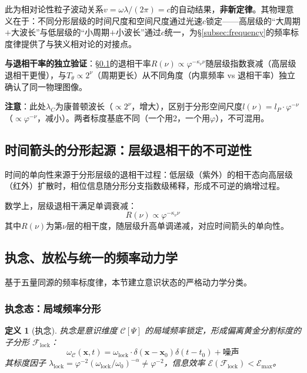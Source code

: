 \documentclass[12pt,a4paper,twocolumn]{article}
\renewcommand{\phi}{\varphi}
\newtheorem{definition}[theorem]{定义}
\begin{document}
此为相对论性粒子波动关系$v = \omega\lambda/(2\pi) = c$的自动结果，\textbf{非新定律}。其物理意义在于：不同分形层级的时间尺度和空间尺度通过光速$c$锁定——高层级的``大周期$+$大波长''与低层级的``小周期$+$小波长''通过$c$统一，为§\ref{subsec:frequency}的频率标度律提供了与狭义相对论的对接点。

\textbf{与退相干率的独立验证}：§\ref{subsec:time_arrow}的退相干率$R(\nu) \propto \phi^{-\kappa_\nu\nu}$随层级指数衰减（高层级退相干更慢），与$T_\theta \propto 2^{\nu}$（周期更长）从不同角度（内禀频率 vs 退相干率）独立确认了同一物理图像。

\textbf{注意}：此处$\lambda_C$为康普顿波长（$\propto 2^{\nu}$，增大），区别于分形空间尺度$l(\nu) = l_P \cdot \phi^{-\nu}$（$\propto \phi^{-\nu}$，减小）。两者标度基底不同（一个用2，一个用$\phi$），不可混用。

\subsection{时间箭头的分形起源：层级退相干的不可逆性}
\label{subsec:time_arrow}
时间的单向性来源于分形层级的退相干过程：低层级（紫外）的相干态向高层级（红外）扩散时，相位信息随分形分支指数级稀释，形成不可逆的熵增过程。

数学上，层级退相干满足单调衰减：
\[
R(\nu) \propto \phi^{-\kappa_\nu \nu}
\]
其中$R(\nu)$为第$\nu$层的相干度，随层级升高单调递减，对应时间箭头的单向性。

\subsection{执念、放松与统一的频率动力学}
\label{subsec:obsession}

基于五量同源的频率标度律，本节建立意识状态的严格动力学分类。

\subsubsection{执念态：局域频率分形}

\begin{definition}[执念]
执念是意识维度 $\mathcal{C}[\Psi]$ 的局域频率锁定，形成偏离黄金分割标度的子分形 $\mathcal{F}_{\text{lock}}$：
\begin{equation}
\omega_{\mathcal{C}}(\mathbf{x},t) = \omega_{\text{lock}} \cdot \delta(\mathbf{x}-\mathbf{x}_0)\delta(t-t_0) + \text{噪声}
\end{equation}
其标度因子 $\lambda_{\text{lock}} = \phi^{-2}(\omega_{\text{lock}}/\omega_0)^{-\alpha} \neq \phi^{-2}$，信息效率 $\mathcal{E}(\mathcal{F}_{\text{lock}}) < \mathcal{E}_{\max}$。
\end{definition}
\end{document}
